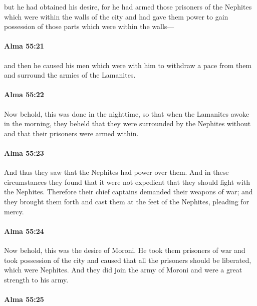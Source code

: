 			but he had obtained his desire,
			for he had armed those prisoners of the Nephites
			which were within the walls of the city
			and had gave them power to gain possession
			of those parts which were within the walls---

		\paragraph{Alma 55:21} %
			\label{ALMA-55-21}

			and then he caused his men which were with him
			to withdraw a pace from them and surround the armies of the Lamanites.

		\paragraph{Alma 55:22} %
			\label{ALMA-55-22}

			Now behold, this was done in the nighttime,
			so that when the Lamanites awoke in the morning,
			they beheld that they were surrounded by the Nephites without
			and that their prisoners were armed within.

		\paragraph{Alma 55:23} %
			\label{ALMA-55-23}

			And thus they saw that the Nephites had power over them.
			And in these circumstances they found that it were not expedient
			that they should fight with the Nephites.
			Therefore their chief captains demanded their weapons of war;
			and they brought them forth
			and cast them at the feet of the Nephites,
			pleading for mercy.

		\paragraph{Alma 55:24} %
			\label{ALMA-55-24}

			Now behold, this was the desire of Moroni.
			He took them prisoners of war and took possession of the city
			and caused that all the prisoners should be liberated, which were Nephites.
			And they did join the army of Moroni and were a great strength to his army.

		\paragraph{Alma 55:25} %
			\label{ALMA-55-25}

